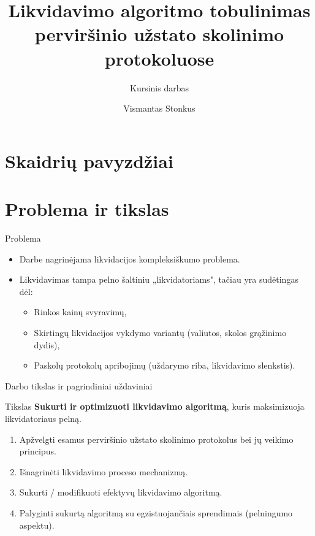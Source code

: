 \documentclass[12pt]{beamer}
\title[]{Likvidavimo algoritmo tobulinimas perviršinio
užstato skolinimo protokoluose}
\subtitle[]{Kursinis darbas}
\author[Vismantas Stonkus]{Vismantas Stonkus}
\date{}
\begin{document}
\begin{frame}
    \titlepage
\end{frame}

\section{Skaidrių pavyzdžiai}


\section{Problema ir tikslas}
\begin{frame}{Problema}
  \begin{itemize}
    \item Darbe nagrinėjama likvidacijos kompleksiškumo problema.
    \item Likvidavimas tampa pelno šaltiniu „likvidatoriams", tačiau yra sudėtingas dėl:
    \begin{itemize}
      \item Rinkos kainų svyravimų,
      \item Skirtingų likvidacijos vykdymo variantų (valiutos, skolos grąžinimo dydis),
      \item Paskolų protokolų apribojimų (uždarymo riba, likvidavimo slenkstis).
    \end{itemize}
  \end{itemize}
\end{frame}

\begin{frame}{Darbo tikslas ir pagrindiniai uždaviniai}
  \begin{block}{Tikslas}
    \textbf{Sukurti ir optimizuoti likvidavimo algoritmą}, kuris maksimizuoja likvidatoriaus pelną.
  \end{block}
  \begin{enumerate}
    \item Apžvelgti esamus perviršinio užstato skolinimo protokolus bei jų veikimo principus.
    \item Išnagrinėti likvidavimo proceso mechanizmą.
    \item Sukurti / modifikuoti efektyvų likvidavimo algoritmą.
    \item Palyginti sukurtą algoritmą su egzistuojančiais sprendimais (pelningumo aspektu).
  \end{enumerate}
\end{frame}
\end{document}
